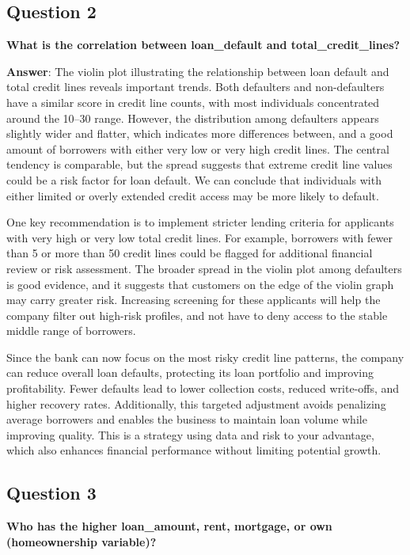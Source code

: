 \documentclass[
]{article}
\begin{document}
\subsection{Question 2}\label{question-2}

\textbf{What is the correlation between loan\_default and
total\_credit\_lines?}

\textbf{Answer}: The violin plot illustrating the relationship between
loan default and total credit lines reveals important trends. Both
defaulters and non-defaulters have a similar score in credit line
counts, with most individuals concentrated around the 10--30 range.
However, the distribution among defaulters appears slightly wider and
flatter, which indicates more differences between, and a good amount of
borrowers with either very low or very high credit lines. The central
tendency is comparable, but the spread suggests that extreme credit line
values could be a risk factor for loan default. We can conclude that
individuals with either limited or overly extended credit access may be
more likely to default.

One key recommendation is to implement stricter lending criteria for
applicants with very high or very low total credit lines. For example,
borrowers with fewer than 5 or more than 50 credit lines could be
flagged for additional financial review or risk assessment. The broader
spread in the violin plot among defaulters is good evidence, and it
suggests that customers on the edge of the violin graph may carry
greater risk. Increasing screening for these applicants will help the
company filter out high-risk profiles, and not have to deny access to
the stable middle range of borrowers.

Since the bank can now focus on the most risky credit line patterns, the
company can reduce overall loan defaults, protecting its loan portfolio
and improving profitability. Fewer defaults lead to lower collection
costs, reduced write-offs, and higher recovery rates. Additionally, this
targeted adjustment avoids penalizing average borrowers and enables the
business to maintain loan volume while improving quality. This is a
strategy using data and risk to your advantage, which also enhances
financial performance without limiting potential growth.

\subsection{Question 3}\label{question-3}

\textbf{Who has the higher loan\_amount, rent, mortgage, or own
(homeownership variable)?}
\end{document}
